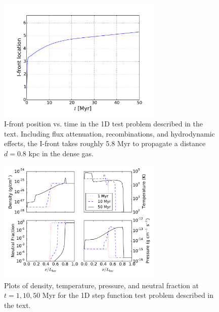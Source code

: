 \begin{figure}[t]
\centerline{\hfill
  \includegraphics[width=0.7\textwidth]{box_wall_hydro-Ifront_history.pdf}
  \hfill}
  \caption{I-front position vs. time in the 1D test problem described in the text. Including flux attenuation, recombinations, and hydrodynamic effects, the I-front takes roughly 5.8 Myr to propagate a distance $d=0.8$ kpc in the dense gas. }
  \label{fig:box_wall_hydro-Ifront_history}
\end{figure}

\begin{figure}[t]
\centerline{\hfill
  \includegraphics[width=0.7\textwidth]{box_wall_hydro-profiles.pdf}
  \hfill}
  \caption{Plots of density, temperature, pressure, and neutral fraction at $t=1, 10, 50$ Myr for the 1D step function test problem described in the text.}
  \label{fig:box_wall_hydro-profiles}
\end{figure}

